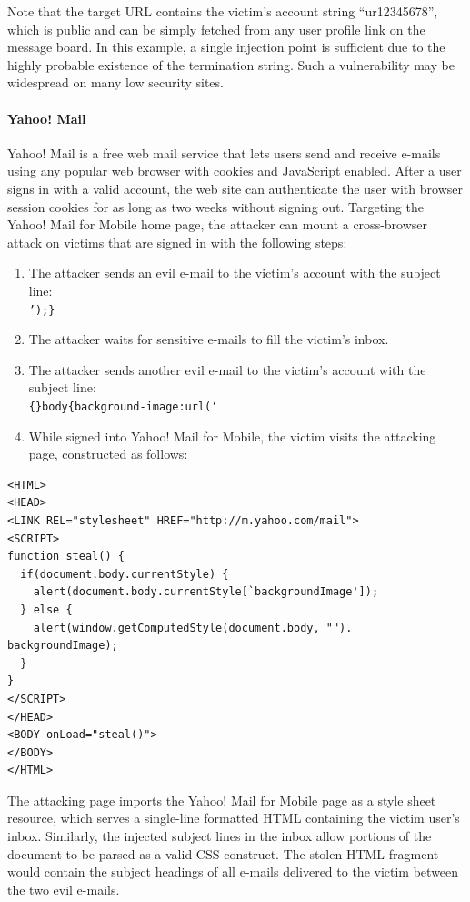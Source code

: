 \documentclass{acm_proc_article-sp}
\begin{document}
Note that the target URL contains the victim's account string ``ur12345678'', which is public and can be simply fetched from any user profile link on the message board. In this example, a single injection point is sufficient due to the highly probable existence of the termination string. Such a vulnerability may be widespread on many low security sites.

\paragraph{Yahoo! Mail} Yahoo! Mail is a free web mail service that lets users send and receive e-mails using any popular web browser with cookies and JavaScript enabled. After a user signs in with a valid account, the web site can authenticate the user with browser session cookies for as long as two weeks without signing out. Targeting the Yahoo! Mail for Mobile home page, the attacker can mount a cross-browser attack on victims that are signed in with the following steps:
\begin{enumerate}
\item{The attacker sends an evil e-mail to the victim's account with the subject line:\\
\texttt{');\}} }
\item{The attacker waits for sensitive e-mails to fill the victim's inbox.}
\item{The attacker sends another evil e-mail to the victim's account with the subject line:\\ \texttt{\{\}body\{background-image:url(`}}
\item{While signed into Yahoo! Mail for Mobile, the victim visits the attacking page, constructed as follows:}
\end{enumerate}
\begin{verbatim}
<HTML>
<HEAD>
<LINK REL="stylesheet" HREF="http://m.yahoo.com/mail">
<SCRIPT>
function steal() {
  if(document.body.currentStyle) {
    alert(document.body.currentStyle[`backgroundImage']);
  } else {
    alert(window.getComputedStyle(document.body, "").
backgroundImage);
  }
}
</SCRIPT>
</HEAD>
<BODY onLoad="steal()">
</BODY>
</HTML>
\end{verbatim}

The attacking page imports the Yahoo! Mail for Mobile page as a style sheet resource, which serves a single-line formatted HTML containing the victim user's inbox. Similarly, the injected subject lines in the inbox allow portions of the document to be parsed as a valid CSS construct. The stolen HTML fragment would contain the subject headings of all e-mails delivered to the victim between the two evil e-mails.
\end{document}

